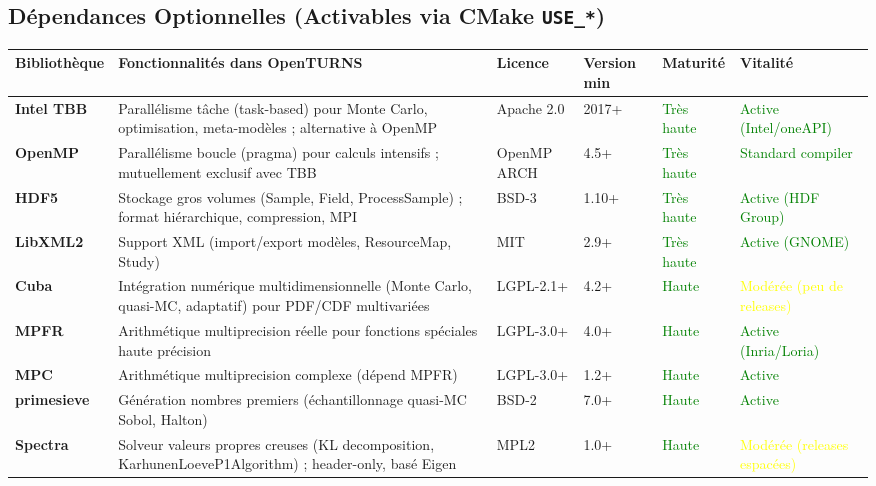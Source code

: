 \documentclass[11pt,a4paper]{article}
\begin{document}
\subsection{Dépendances Optionnelles (Activables via CMake \texttt{USE\_*})}

\begin{longtable}{@{}p{2.2cm}p{3.5cm}p{2.5cm}p{1.8cm}p{2.5cm}p{2.5cm}@{}}
\toprule
\textbf{Bibliothèque} & \textbf{Fonctionnalités dans OpenTURNS} & \textbf{Licence} & \textbf{Version min} & \textbf{Maturité} & \textbf{Vitalité} \\
\midrule
\textbf{Intel TBB} & Parallélisme tâche (task-based) pour Monte Carlo, optimisation, meta-modèles ; alternative à OpenMP & Apache 2.0 & 2017+ & \textcolor{green}{Très haute} & \textcolor{green}{Active (Intel/oneAPI)} \\
\textbf{OpenMP} & Parallélisme boucle (pragma) pour calculs intensifs ; mutuellement exclusif avec TBB & OpenMP ARCH & 4.5+ & \textcolor{green}{Très haute} & \textcolor{green}{Standard compiler} \\
\textbf{HDF5} & Stockage gros volumes (Sample, Field, ProcessSample) ; format hiérarchique, compression, MPI & BSD-3 & 1.10+ & \textcolor{green}{Très haute} & \textcolor{green}{Active (HDF Group)} \\
\textbf{LibXML2} & Support XML (import/export modèles, ResourceMap, Study) & MIT & 2.9+ & \textcolor{green}{Très haute} & \textcolor{green}{Active (GNOME)} \\
\textbf{Cuba} & Intégration numérique multidimensionnelle (Monte Carlo, quasi-MC, adaptatif) pour PDF/CDF multivariées & LGPL-2.1+ & 4.2+ & \textcolor{green}{Haute} & \textcolor{yellow}{Modérée (peu de releases)} \\
\textbf{MPFR} & Arithmétique multiprecision réelle pour fonctions spéciales haute précision & LGPL-3.0+ & 4.0+ & \textcolor{green}{Haute} & \textcolor{green}{Active (Inria/Loria)} \\
\textbf{MPC} & Arithmétique multiprecision complexe (dépend MPFR) & LGPL-3.0+ & 1.2+ & \textcolor{green}{Haute} & \textcolor{green}{Active} \\
\textbf{primesieve} & Génération nombres premiers (échantillonnage quasi-MC Sobol, Halton) & BSD-2 & 7.0+ & \textcolor{green}{Haute} & \textcolor{green}{Active} \\
\textbf{Spectra} & Solveur valeurs propres creuses (KL decomposition, KarhunenLoeveP1Algorithm) ; header-only, basé Eigen & MPL2 & 1.0+ & \textcolor{green}{Haute} & \textcolor{yellow}{Modérée (releases espacées)} \\

\end{longtable}
\end{document}

